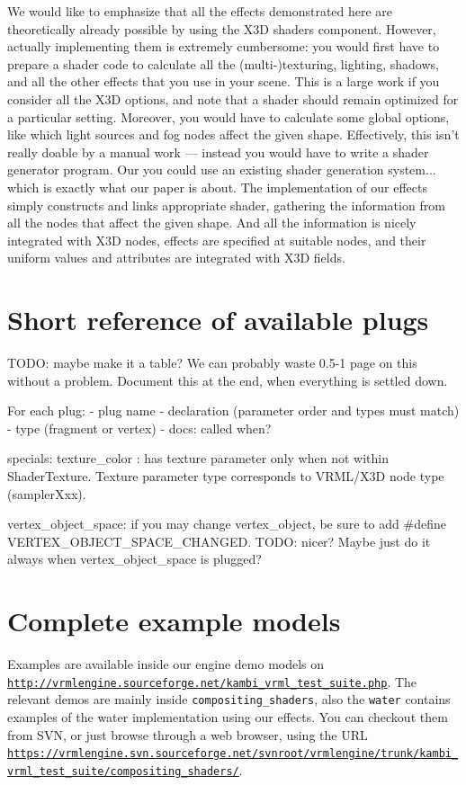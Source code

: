 \documentclass{acmsiggraph}                     %
\newcommand*{\myhref}[2]{\texttt{\href{#1}{\nolinkurl{#2}}}}
\begin{document}
We would like to emphasize that all the effects demonstrated here
are theoretically already possible by using the X3D shaders component.
However, actually implementing them is extremely cumbersome: you would first
have to prepare a shader code to calculate all the (multi-)texturing, lighting,
shadows, and all the other effects that you use in your scene.
This is a large work if you consider all the X3D options, and note that
a shader should remain optimized for a particular setting.
Moreover, you would have to calculate some global options,
like which light sources and fog nodes affect the given shape.
Effectively, this isn't really doable by a manual work --- instead
you would have to write a shader generator program. Our you could use
an existing shader generation system... which is exactly what our paper
is about. The implementation of our effects simply constructs and links
appropriate shader, gathering the information from all the nodes
that affect the given shape. And all the information is nicely integrated
with X3D nodes, effects are specified at suitable nodes, and their
uniform values and attributes are integrated with X3D fields.

\section{Short reference of available plugs}

TODO: maybe make it a table? We can probably waste 0.5-1 page on this
without a problem. Document this at the end, when everything is settled down.

For each plug:
- plug name
- declaration (parameter order and types must match)
- type (fragment or vertex)
- docs: called when?

specials:
texture\_color : has texture parameter only when not within ShaderTexture.
Texture parameter type corresponds to VRML/X3D node type (samplerXxx).

vertex\_object\_space: if you may change vertex\_object,
be sure to add \#define VERTEX\_OBJECT\_SPACE\_CHANGED.
TODO: nicer? Maybe just do it always when vertex\_object\_space is plugged?

\section{Complete example models}

Examples are available inside our engine demo models on
\myhref{http://vrmlengine.sourceforge.net/kambi\_vrml\_test\_suite.php}{http://vrmlengine.sourceforge.net/kambi_vrml_test_suite.php}.
The relevant demos are mainly inside \texttt{compositing\_shaders},
also the \texttt{water} contains examples of the water implementation
using our effects.
You can checkout them from SVN, or just browse through a web browser,
using the URL
\myhref{https://vrmlengine.svn.sourceforge.net/svnroot/vrmlengine/trunk/kambi\_vrml\_test\_suite/compositing\_shaders/}{https://vrmlengine.svn.sourceforge.net/svnroot/vrmlengine/trunk/kambi_vrml_test_suite/compositing_shaders/}.
\end{document}
